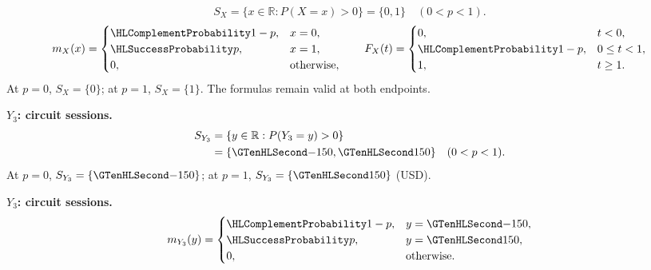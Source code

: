 \[S_X=\{x\in\mathbb R:P(X=x)>0\}=\{0,1\}\quad(0<p<1).\]
\[m_X(x)=\begin{cases}\FailureProb{1-p},&x=0,\\\SuccessProb{p},&x=1,\\0,&\text{otherwise},\end{cases}\qquad
F_X(t)=\begin{cases}0,&t<0,\\\FailureProb{1-p},&0\leq t<1,\\1,&t\geq1.\end{cases}\]
At $p=0$, $S_X=\{0\}$; at $p=1$, $S_X=\{1\}$. The formulas remain valid at both endpoints.
\noindent\begin{minipage}[t]{.48\linewidth}
\textbf{$Y_3$: circuit sessions.}
\[
\begin{aligned}
S_{Y_3}&=\{y\in\mathbb R:P(Y_3=y)>0\}\\
&=\{\Money{-150},\Money{150}\}\quad(0<p<1).
\end{aligned}
\]
At $p=0$, $S_{Y_3}=\{\Money{-150}\}$; at $p=1$, $S_{Y_3}=\{\Money{150}\}$ (USD).
\end{minipage}\par
{}
\noindent\begin{minipage}[t]{.48\linewidth}
\textbf{$Y_3$: circuit sessions.}
\[m_{Y_3}(y)=\begin{cases}\FailureProb{1-p},&y=\Money{-150},\\\SuccessProb{p},&y=\Money{150},\\0,&\text{otherwise}.\end{cases}\]
\end{minipage}\par
